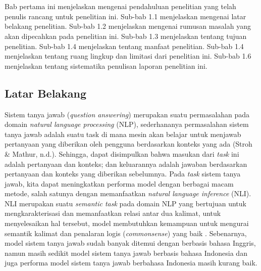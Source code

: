 \chapter{\babSatu}
\label{bab:1}
Bab pertama ini menjelaskan mengenai pendahuluan penelitian yang telah penulis rancang untuk penelitian ini. Sub-bab 1.1 menjelaskan mengenai latar belakang penelitian. Sub-bab 1.2 menjelaskan mengenai rumusan masalah yang akan dipecahkan pada penelitian ini. Sub-bab 1.3 menjelaskan tentang tujuan penelitian. Sub-bab 1.4 menjelaskan tentang manfaat penelitian. Sub-bab 1.4 menjelaskan tentang ruang lingkup dan limitasi dari penelitian ini. Sub-bab 1.6 menjelaskan tentang sistematika penulisan laporan penelitian ini.

\section{Latar Belakang}
\label{sec:latarBelakang}
Sistem tanya jawab (\emph{question answering}) merupakan suatu permasalahan pada domain \emph{natural language processing} (NLP), sederhananya permasalahan sistem tanya jawab adalah suatu task di mana mesin akan belajar untuk menjawab pertanyaan yang diberikan oleh pengguna berdasarkan konteks yang ada (Stroh \& Mathur, n.d.). Sehingga, dapat disimpulkan bahwa masukan dari \emph{task} ini adalah pertanyaan dan konteks; dan keluarannya adalah jawaban berdasarkan pertanyaan dan konteks yang diberikan sebelumnya. Pada \emph{task} sistem tanya jawab, kita dapat meningkatkan performa model dengan berbagai macam metode, salah satunya dengan memanfaatkan \emph{natural language inference} (NLI). NLI merupakan suatu \emph{semantic task} pada domain NLP yang bertujuan untuk mengkarakterisasi dan memanfaatkan relasi antar dua kalimat, untuk menyelesaikan hal tersebut, model membutuhkan kemampuan untuk mengurai semantik kalimat dan penalaran logis (\emph{commonsense}) yang baik \citep{bowman-etal-2015-large}. Sebenarnya, model sistem tanya jawab sudah banyak ditemui dengan berbasis bahasa Inggris, namun masih sedikit model sistem tanya jawab berbasis bahasa Indonesia dan juga performa model sistem tanya jawab berbahasa Indonesia masih kurang baik.


